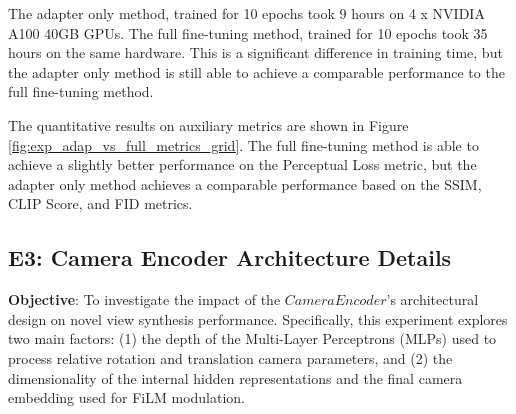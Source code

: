 The adapter only method, trained for 10 epochs took 9 hours on 4 x NVIDIA A100 40GB GPUs. The full fine-tuning method, trained for 10 epochs took 35 hours on the same hardware. This is a significant difference in training time, but the adapter only method is still able to achieve a comparable performance to the full fine-tuning method.

The quantitative results on auxiliary metrics are shown in Figure \ref{fig:exp_adap_vs_full_metrics_grid}. The full fine-tuning method is able to achieve a slightly better performance on the Perceptual Loss metric, but the adapter only method achieves a comparable performance based on the SSIM, CLIP Score, and FID metrics.

\subsection{E3: Camera Encoder Architecture Details}\label{ssec:exp_camera_encoder_depth}
\textbf{Objective}:
To investigate the impact of the $CameraEncoder$'s architectural design on novel view synthesis performance. Specifically, this experiment explores two main factors: (1) the depth of the Multi-Layer Perceptrons (MLPs) used to process relative rotation and translation camera parameters, and (2) the dimensionality of the internal hidden representations and the final camera embedding used for FiLM modulation.

